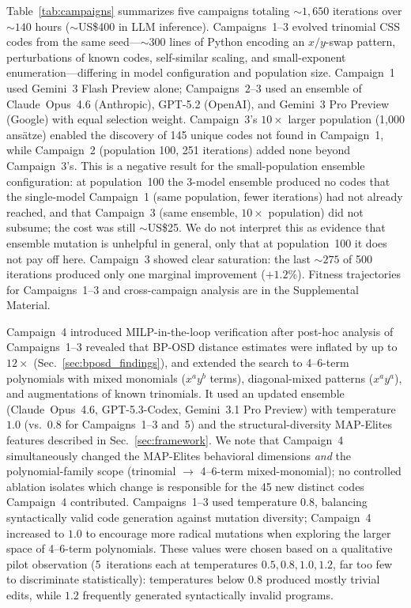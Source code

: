 \documentclass[aps,prxquantum,twocolumn,superscriptaddress,nofootinbib]{revtex4-2}
\begin{document}
Table~\ref{tab:campaigns} summarizes five campaigns totaling ${\sim}1{,}650$ iterations over ${\sim}140$ hours (${\sim}$US\$400 in LLM inference).
Campaigns~1--3 evolved trinomial CSS codes from the same seed---${\sim}300$ lines of Python encoding an $x/y$-swap pattern, perturbations of known codes, self-similar scaling, and small-exponent enumeration---differing in model configuration and population size.
Campaign~1 used Gemini~3 Flash Preview alone; Campaigns~2--3 used an ensemble of Claude~Opus~4.6 (Anthropic), GPT-5.2 (OpenAI), and Gemini~3 Pro Preview (Google) with equal selection weight.
Campaign~3's $10\times$ larger population (1{,}000 ansätze) enabled the discovery of 145 unique codes not found in Campaign~1, while Campaign~2 (population 100, 251 iterations) added none beyond Campaign~3's.
This is a negative result for the small-population ensemble configuration: at population~100 the 3-model ensemble produced no codes that the single-model Campaign~1 (same population, fewer iterations) had not already reached, and that Campaign~3 (same ensemble, $10\times$ population) did not subsume; the cost was still ${\sim}$US\$25.
We do not interpret this as evidence that ensemble mutation is unhelpful in general, only that at population~100 it does not pay off here.
Campaign~3 showed clear saturation: the last ${\sim}275$ of 500 iterations produced only one marginal improvement ($+1.2\%$). Fitness trajectories for Campaigns~1--3 and cross-campaign analysis are in the Supplemental Material.

Campaign~4 introduced MILP-in-the-loop verification after post-hoc analysis of Campaigns~1--3 revealed that BP-OSD distance estimates were inflated by up to $12\times$ (Sec.~\ref{sec:bposd_findings}), and extended the search to 4--6-term polynomials with mixed monomials ($x^a y^b$ terms), diagonal-mixed patterns ($x^a y^a$), and augmentations of known trinomials. 
It used an updated ensemble (Claude~Opus~4.6, GPT-5.3-Codex, Gemini~3.1 Pro Preview) with temperature $1.0$ (vs.\ $0.8$ for Campaigns~1--3 and~5) and the structural-diversity MAP-Elites features described in Sec.~\ref{sec:framework}.
We note that Campaign~4 simultaneously changed the MAP-Elites behavioral dimensions \emph{and} the polynomial-family scope (trinomial $\to$ 4--6-term mixed-monomial); no controlled ablation isolates which change is responsible for the 45 new distinct codes Campaign~4 contributed.
Campaigns~1--3 used temperature $0.8$, balancing syntactically valid code generation against mutation diversity; Campaign~4 increased to $1.0$ to encourage more radical mutations when exploring the larger space of 4--6-term polynomials.
These values were chosen based on a qualitative pilot observation (5~iterations each at temperatures $0.5, 0.8, 1.0, 1.2$, far too few to discriminate statistically): temperatures below $0.8$ produced mostly trivial edits, while $1.2$ frequently generated syntactically invalid programs.
\end{document}
